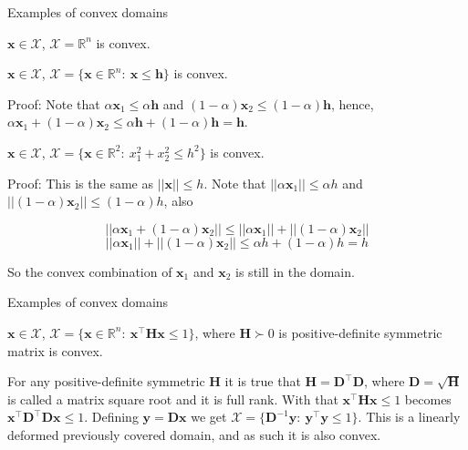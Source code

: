 \documentclass{beamer}
\begin{document}
\begin{frame}{Examples of convex domains}
	\begin{flushleft}
		
		$\mathbf{x} \in \mathcal{X}$, $\mathcal{X} = \mathbb{R}^n$  is convex.
		
		\bigskip
		
		$\mathbf{x} \in \mathcal{X}$, $\mathcal{X} = \{ \mathbf{x} \in \mathbb{R}^n: \ \mathbf{x} \leq \mathbf{h} \}$ is convex.
		
		\bigskip
		
		Proof: Note that $\alpha \mathbf{x}_1 \leq \alpha \mathbf{h}$ and $(1 - \alpha) \mathbf{x}_2 \leq (1 - \alpha) \mathbf{h}$, hence, $\alpha \mathbf{x}_1 + (1 - \alpha) \mathbf{x}_2 \leq 
		\alpha \mathbf{h} + (1 - \alpha) \mathbf{h} = \mathbf{h}$. \qedsymbol
		
		\bigskip
		
		$\mathbf{x} \in \mathcal{X}$, $\mathcal{X} = \{ \mathbf{x} \in \mathbb{R}^2: \ x_1^2+x_2^2 \leq h^2 \}$ is convex.
		
		\bigskip
		
		Proof: This is the same as $|| \mathbf{x} || \leq h$. Note that $|| \alpha \mathbf{x}_1 || \leq \alpha h$ and $|| (1 - \alpha) \mathbf{x}_2 || \leq (1 - \alpha) h$, also 
		
		$$|| \alpha \mathbf{x}_1 + (1 - \alpha) \mathbf{x}_2 || \leq || \alpha \mathbf{x}_1 || + || (1 - \alpha) \mathbf{x}_2 ||$$
		$$|| \alpha \mathbf{x}_1 || + || (1 - \alpha) \mathbf{x}_2 || \leq \alpha h + (1 - \alpha) h = h$$ 
		
		So the convex combination of $\mathbf{x}_1$ and $\mathbf{x}_2$ is still in the domain. \qedsymbol
		
		
	\end{flushleft}
\end{frame}






\begin{frame}{Examples of convex domains}
	\begin{flushleft}
		
		$\mathbf{x} \in \mathcal{X}$, $\mathcal{X} = \{ \mathbf{x} \in \mathbb{R}^n: \ \mathbf{x}^\top \mathbf{H} \mathbf{x} \leq 1 \}$, where $\mathbf{H} \succ 0$ is positive-definite symmetric matrix is convex. 
		
		\bigskip
		
		For any positive-definite symmetric $\mathbf{H}$ it is true that $\mathbf{H} = \mathbf{D}^\top\mathbf{D}$, where $\mathbf{D} = \sqrt{\mathbf{H}}$ is called a matrix square root and it is full rank. With that $\mathbf{x}^\top \mathbf{H} \mathbf{x} \leq 1$ becomes $\mathbf{x}^\top \mathbf{D}^\top\mathbf{D} \mathbf{x} \leq 1$. Defining $\mathbf{y} = \mathbf{D} \mathbf{x}$ we get $\mathcal{X} = \{ \mathbf{D}^{-1}\mathbf{y}: \ \mathbf{y}^\top \mathbf{y} \leq 1 \}$. This is a linearly deformed previously covered domain, and as such it is also convex.
		
	\end{flushleft}
\end{frame}
\end{document}
